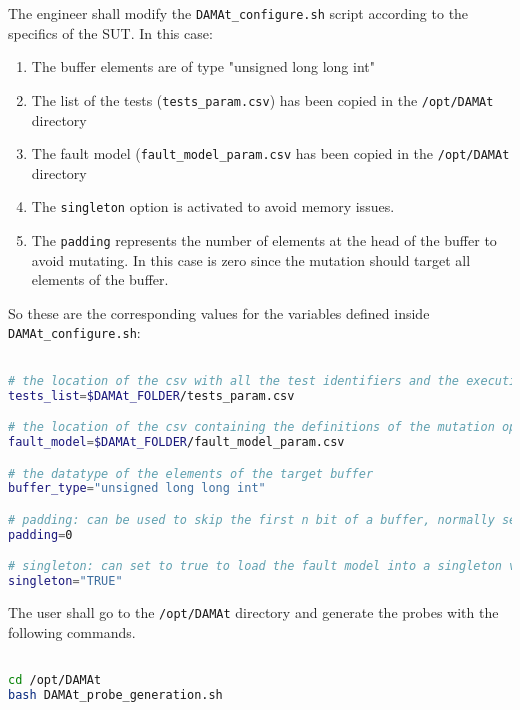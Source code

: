 The engineer shall modify the \texttt{DAMAt\_configure.sh} script according to the specifics of the SUT.
In this case:
\begin{enumerate}
	\item The buffer elements are of type "unsigned long long int"
	\item The list of the tests (\texttt{tests\_param.csv}) has been copied in the \texttt{/opt/DAMAt} directory
	\item The fault model (\texttt{fault\_model\_param.csv} has been copied in the \texttt{/opt/DAMAt} directory
	\item The \texttt{singleton} option is activated to avoid memory issues.
	\item The \texttt{padding} represents the number of elements at the head of the buffer to avoid mutating. In this case is zero since the mutation should target all elements of the buffer.
\end{enumerate}

So these are the corresponding values for the variables defined inside \texttt{DAMAt\_configure.sh}:

\begin{lstlisting}[language=bash]

# the location of the csv with all the test identifiers and the execution time
tests_list=$DAMAt_FOLDER/tests_param.csv

# the location of the csv containing the definitions of the mutation operators
fault_model=$DAMAt_FOLDER/fault_model_param.csv

# the datatype of the elements of the target buffer
buffer_type="unsigned long long int"

# padding: can be used to skip the first n bit of a buffer, normally set to 0
padding=0

# singleton: can set to true to load the fault model into a singleton variable, normally set to "TRUE", can also  be set to "FALSE"
singleton="TRUE"

\end{lstlisting}

The user shall go to the \texttt{/opt/DAMAt} directory and generate the probes with the following commands.

\begin{lstlisting}[language=bash]

cd /opt/DAMAt
bash DAMAt_probe_generation.sh

\end{lstlisting}


